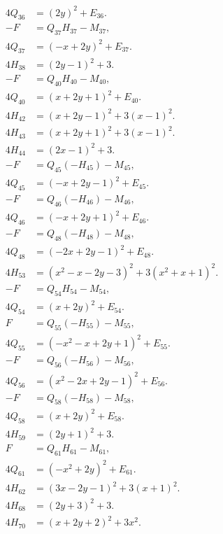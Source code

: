 \documentclass[11pt]{article}
\begin{document}
\begin{align}
4Q_{36}&=(2y)^2+E_{36}.\label{eq:sign36b}\\
-F&=Q_{37}H_{37}-M_{37},\label{eq:sign37}\\
4Q_{37}&=(-x+2y)^2+E_{37}.\label{eq:sign37b}\\
4H_{38}&=(2y-1)^2+3.\label{eq:sign38}\\
-F&=Q_{40}H_{40}-M_{40},\label{eq:sign40}\\
4Q_{40}&=(x+2y+1)^2+E_{40}.\label{eq:sign40b}\\
4H_{42}&=(x+2y-1)^2+3(x-1)^2.\label{eq:sign42}\\
4H_{43}&=(x+2y+1)^2+3(x-1)^2.\label{eq:sign43}\\
4H_{44}&=(2x-1)^2+3.\label{eq:sign44}\\
-F&=Q_{45}(-H_{45})-M_{45},\label{eq:sign45}\\
4Q_{45}&=(-x+2y-1)^2+E_{45}.\label{eq:sign45b}\\
-F&=Q_{46}(-H_{46})-M_{46},\label{eq:sign46}\\
4Q_{46}&=(-x+2y+1)^2+E_{46}.\label{eq:sign46b}\\
-F&=Q_{48}(-H_{48})-M_{48},\label{eq:sign48}\\
4Q_{48}&=(-2x+2y-1)^2+E_{48}.\label{eq:sign48b}\\
4H_{53}&=(x^{2}-x-2y-3)^2+3(x^{2}+x+1)^2.\label{eq:sign53}\\
-F&=Q_{54}H_{54}-M_{54},\label{eq:sign54}\\
4Q_{54}&=(x+2y)^2+E_{54}.\label{eq:sign54b}\\
F&=Q_{55}(-H_{55})-M_{55},\label{eq:sign55}\\
4Q_{55}&=(-x^{2}-x+2y+1)^2+E_{55}.\label{eq:sign55b}\\
-F&=Q_{56}(-H_{56})-M_{56},\label{eq:sign56}\\
4Q_{56}&=(x^{2}-2x+2y-1)^2+E_{56}.\label{eq:sign56b}\\
-F&=Q_{58}(-H_{58})-M_{58},\label{eq:sign58}\\
4Q_{58}&=(x+2y)^2+E_{58}.\label{eq:sign58b}\\
4H_{59}&=(2y+1)^2+3.\label{eq:sign59}\\
F&=Q_{61}H_{61}-M_{61},\label{eq:sign61}\\
4Q_{61}&=(-x^{2}+2y)^2+E_{61}.\label{eq:sign61b}\\
4H_{62}&=(3x-2y-1)^2+3(x+1)^2.\label{eq:sign62}\\
4H_{68}&=(2y+3)^2+3.\label{eq:sign68}\\
4H_{70}&=(x+2y+2)^2+3x^2.\label{eq:sign70}\\

\end{align}
\end{document}
